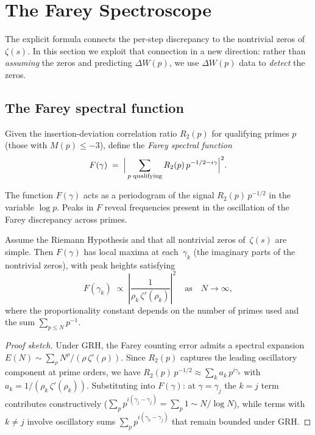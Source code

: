 
\section{The Farey Spectroscope}\label{sec:spectroscope}

The explicit formula connects the per-step discrepancy to the nontrivial
zeros of~$\zeta(s)$.  In this section we exploit that connection in a
new direction: rather than \emph{assuming} the zeros and predicting
$\Delta W(p)$, we use $\Delta W(p)$ data to \emph{detect} the zeros.

\subsection{The Farey spectral function}

\begin{definition}\label{def:spectral-fn}
Given the insertion-deviation correlation ratio $R_2(p)$ for qualifying
primes $p$ (those with $M(p)\le-3$), define the \emph{Farey spectral function}
\[
  F(\gamma) \;=\; \Bigl|\,\sum_{p\;\text{qualifying}} R_2(p)\,p^{-1/2-i\gamma}\Bigr|^2.
\]
\end{definition}

The function $F(\gamma)$ acts as a periodogram of the signal $R_2(p)\,p^{-1/2}$
in the variable $\log p$.  Peaks in $F$ reveal frequencies present in the
oscillation of the Farey discrepancy across primes.

\begin{proposition}[GRH]\label{prop:spectroscope}
Assume the Riemann Hypothesis and that all nontrivial zeros of~$\zeta(s)$
are simple.  Then $F(\gamma)$ has local maxima at each~$\gamma_k$
(the imaginary parts of the nontrivial zeros), with peak heights satisfying
\[
  F(\gamma_k) \;\propto\; \left|\frac{1}{\rho_k\,\zeta'(\rho_k)}\right|^2
  \quad\text{as}\quad N\to\infty,
\]
where the proportionality constant depends on the number of primes used
and the sum $\sum_{p\le N}p^{-1}$.
\end{proposition}

\begin{proof}[Proof sketch]
Under GRH, the Farey counting error admits a spectral expansion
$E(N) \sim \sum_\rho N^\rho/(\rho\,\zeta'(\rho))$.  Since $R_2(p)$
captures the leading oscillatory component at prime orders, we have
$R_2(p)\,p^{-1/2}\approx\sum_k a_k\,p^{i\gamma_k}$ with
$a_k = 1/(\rho_k\,\zeta'(\rho_k))$.  Substituting into $F(\gamma)$:
at $\gamma = \gamma_j$ the $k{=}j$ term contributes constructively
($\sum_p p^{i(\gamma_j-\gamma_j)}=\sum_p 1 \sim N/\log N$),
while terms with $k\ne j$ involve oscillatory sums
$\sum_p p^{i(\gamma_k-\gamma_j)}$ that remain bounded under GRH.
\end{proof}

